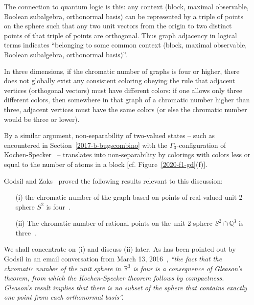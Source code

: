 The connection to quantum logic is this: any context
(block, maximal observable, Boolean subalgebra, orthonormal basis)
can be represented by a triple of points on the sphere
such that any two unit vectors from the origin
to two distinct points of that triple of points are orthogonal.
Thus graph adjacency in logical terms indicates
``belonging to some common context (block, maximal observable, Boolean subalgebra, orthonormal basis)''.

In three dimensions, if the chromatic number of  graphs is four or higher,
there does not globally exist any consistent
coloring obeying the rule that adjacent vertices (orthogonal vectors)
must have different colors: if one allows only three different colors,
then somewhere in that graph of a chromatic number higher than three, adjacent vertices must have the same colors
(or else the chromatic number would be three or lower).


By a similar argument, non-separability of two-valued states
--
such as encountered in Section~\ref{2017-b-bugscombino}
with the $\Gamma_3$-configuration of Kochen-Specker~\cite[p.~70]{kochen1}
-- translates into non-separability by colorings
with colors less or equal to the number of atoms in a block
[cf. Figure~\ref{2020-f1-gd}(f)].

Godsil and Zaks~\cite{godsil-zaks,havlicek-2000}
proved the following results relevant to this discussion:
\begin{enumerate}
\item[(i)]
the chromatic number of the graph based on points of real-valued unit 2-sphere $S^2$
is four~\cite[Lemma~1.1]{godsil-zaks}.
\item[(ii)]
The chromatic number of rational points on the unit 2-sphere
$S^2\cap \mathbb{Q}^3$
is three~\cite[Lemma~1.2]{godsil-zaks}.
\end{enumerate}

We shall concentrate on (i) and discuss (ii) later.
As has been pointed out by Godsil in an email conversation from March 13, 2016~\cite{godsil-pc},
{\em ``the fact that the chromatic number of the unit sphere in $\mathbb{R}^3$
is four is a consequence of  Gleason's theorem,
from which the Kochen-Specker theorem follows by compactness.
Gleason's result implies that there is no subset of the sphere that contains exactly one point from each orthonormal basis''.}

